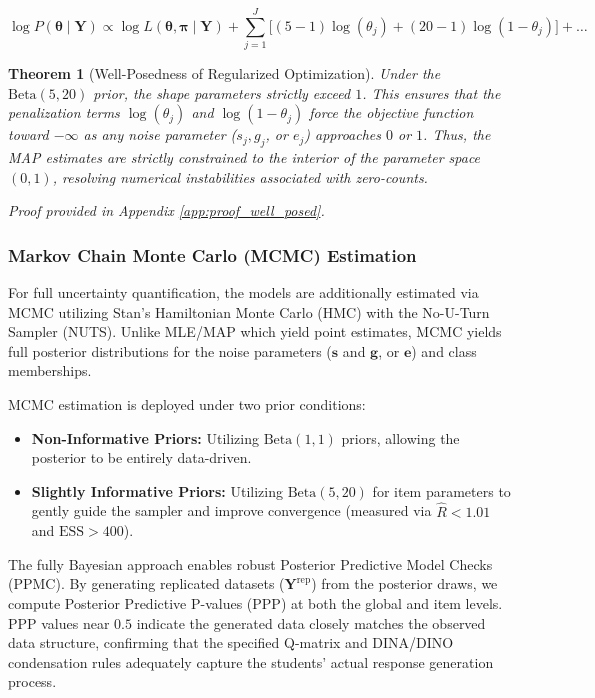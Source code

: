 \documentclass[11pt,a4paper]{article}
\newtheorem{theorem}{Theorem}
\begin{document}
$$ \log P(\boldsymbol{\theta} \mid \mathbf{Y}) 
\propto \log L(\boldsymbol{\theta}, \boldsymbol{\pi} \mid \mathbf{Y}) 
+ \sum_{j=1}^J \Big[ (5 - 1)\log(\theta_j) + (20 - 1)\log(1 - \theta_j) \Big] + \dots $$

\begin{theorem}[Well-Posedness of Regularized Optimization]\label{thm:well_posed}
Under the $\text{Beta}(5, 20)$ prior, the shape parameters strictly exceed $1$. 
This ensures that the penalization terms $\log(\theta_j)$ and $\log(1-\theta_j)$ 
force the objective function toward $-\infty$ as any noise parameter 
($s_j, g_j$, or $e_j$) approaches $0$ or $1$. 
Thus, the MAP estimates are strictly constrained to the interior of the 
parameter space $(0, 1)$, resolving numerical instabilities associated 
with zero-counts.
\end{theorem}
\textit{Proof provided in Appendix \ref{app:proof_well_posed}.}

\subsubsection{Markov Chain Monte Carlo (MCMC) Estimation}
For full uncertainty quantification, the models are additionally estimated via MCMC 
utilizing Stan's Hamiltonian Monte Carlo (HMC) with the No-U-Turn Sampler (NUTS). 
Unlike MLE/MAP which yield point estimates, MCMC yields full posterior 
distributions for the noise parameters ($\mathbf{s}$ and $\mathbf{g}$, or $\mathbf{e}$) 
and class memberships. 

MCMC estimation is deployed under two prior conditions:
\begin{itemize}
    \item \textbf{Non-Informative Priors:} Utilizing $\text{Beta}(1, 1)$ priors, 
    allowing the posterior to be entirely data-driven.
    \item \textbf{Slightly Informative Priors:} Utilizing $\text{Beta}(5, 20)$ 
    for item parameters to gently guide the sampler and improve convergence 
    (measured via $\hat{R} < 1.01$ and $\text{ESS} > 400$).
\end{itemize}

The fully Bayesian approach enables robust Posterior Predictive Model Checks (PPMC). 
By generating replicated datasets ($\mathbf{Y}^{\text{rep}}$) from the posterior draws, 
we compute Posterior Predictive P-values (PPP) at both the global and item levels. 
PPP values near $0.5$ indicate the generated data closely matches 
the observed data structure, confirming that the specified Q-matrix and 
DINA/DINO condensation rules adequately capture the students' actual 
response generation process.
\end{document}
